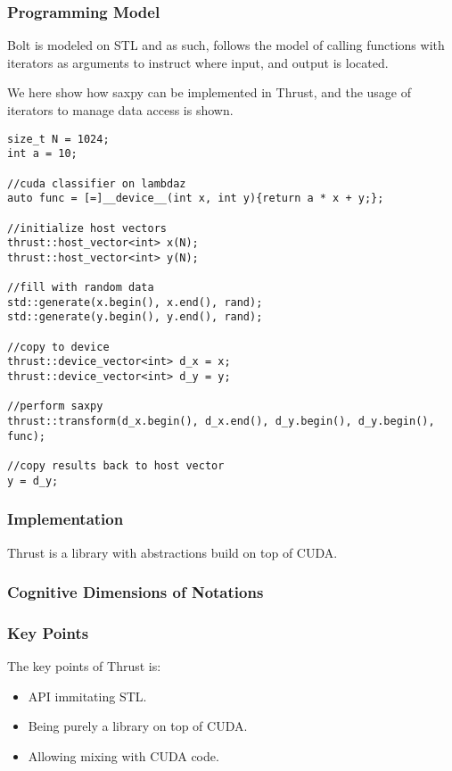 \subsubsection{Programming Model}
Bolt is modeled on STL and as such, follows the model of calling functions with iterators as arguments to instruct where input, and output is located.

We here show how saxpy can be implemented in Thrust, and the usage of iterators to manage data access is shown.
\begin{lstlisting}
size_t N = 1024;
int a = 10;

//cuda classifier on lambdaz
auto func = [=]__device__(int x, int y){return a * x + y;};

//initialize host vectors
thrust::host_vector<int> x(N);
thrust::host_vector<int> y(N);

//fill with random data
std::generate(x.begin(), x.end(), rand);
std::generate(y.begin(), y.end(), rand);

//copy to device
thrust::device_vector<int> d_x = x;
thrust::device_vector<int> d_y = y;

//perform saxpy
thrust::transform(d_x.begin(), d_x.end(), d_y.begin(), d_y.begin(), func);

//copy results back to host vector
y = d_y;
\end{lstlisting}

\subsubsection{Implementation}
Thrust is a library with abstractions build on top of CUDA.

\subsubsection{Cognitive Dimensions of Notations}

\subsubsection{Key Points}
The key points of Thrust is:

\begin{itemize}
\item API immitating STL.
\item Being purely a library on top of CUDA.
\item Allowing mixing with CUDA code. 
\end{itemize}

